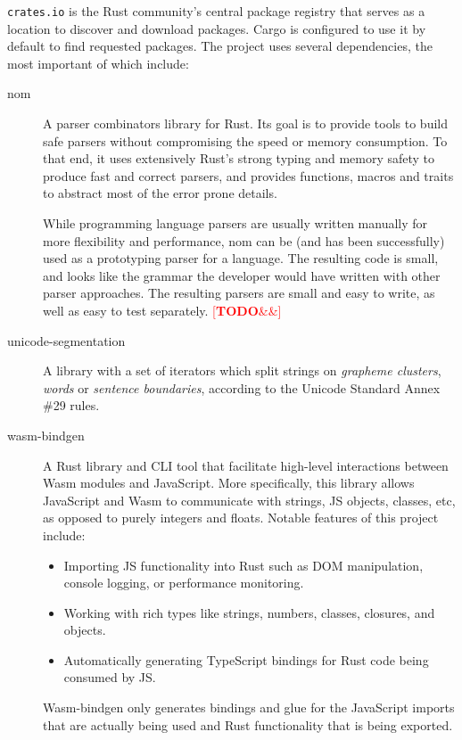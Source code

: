 \documentclass[english,engineering]{wizthesis}
\newcommand{\todo}[1]{%
  \textcolor{red}{[\textbf{TODO}\ifx&#1&{}\else{ }\fi\emph{#1}]}%
}
\newcommand{\paraphrase}[1]{#1}
\begin{document}
\texttt{crates.io} \paraphrase{is the Rust community's central package registry
that serves as a location to discover and download packages. Cargo is configured
to use it by default to find requested packages.} The project uses several
dependencies, the most important of which include:
\begin{description}
  \item[nom] \cite{nom} \paraphrase{A parser combinators library for Rust. Its
  goal is to provide tools to build safe parsers without compromising the speed
  or memory consumption. To that end, it uses extensively Rust's strong typing
  and memory safety to produce fast and correct parsers, and provides functions,
  macros and traits to abstract most of the error prone details.
  
  While programming language parsers are usually written manually for more
  flexibility and performance, nom can be (and has been successfully) used as a
  prototyping parser for a language. The resulting code is small, and looks like
  the grammar the developer would have written with other parser approaches. The
  resulting parsers are small and easy to write, as well as easy to test
  separately.} \todo{\cite{couprie-2015}}
  \item[unicode-segmentation] \cite{unicode-segmentation} A library with a set
  of iterators which split strings on \emph{grapheme clusters}, \emph{words} or
  \emph{sentence boundaries}, according to the Unicode Standard Annex \#29
  \cite{unicode-standard-annex-29} rules.
  \item[wasm-bindgen] \cite{wasm-bindgen} \paraphrase{A Rust library and CLI
  tool that facilitate high-level interactions between Wasm modules and
  JavaScript. More specifically, this library allows JavaScript and Wasm to
  communicate with strings, JS objects, classes, etc, as opposed to purely
  integers and floats. Notable features of this project include:
  \begin{itemize}
    \item Importing JS functionality into Rust such as DOM manipulation, console
    logging, or performance monitoring.
    \item Working with rich types like strings, numbers, classes, closures, and
    objects.
    \item Automatically generating TypeScript bindings for Rust code being
    consumed by JS.
  \end{itemize}
  Wasm-bindgen only generates bindings and glue for the JavaScript imports that
  are actually being used and Rust functionality that is being exported.}

\end{description}
\end{document}
